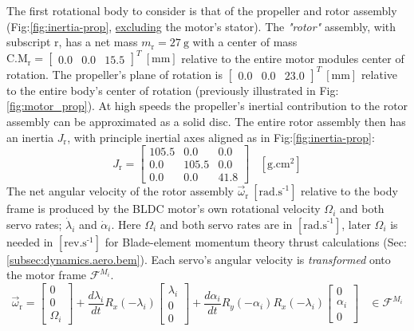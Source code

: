 \par
The first rotational body to consider is that of the propeller and rotor assembly (Fig:\ref{fig:inertia-prop}, \underline{excluding} the motor's stator). The \emph{"rotor"} assembly, with subscript r, has a net mass $m_{\text{r}}=27~\text{g}$ with a center of mass $\text{C.M}_{\text{r}}=\begin{bmatrix}0.0&0.0&15.5\end{bmatrix}^T~[\text{mm}]$ relative to the entire motor modules center of rotation. The propeller's plane of rotation is $\begin{bmatrix}0.0&0.0&23.0\end{bmatrix}^T~[\text{mm}]$ relative to the entire body's center of rotation (previously illustrated in Fig:\ref{fig:motor_prop}). At high speeds the propeller's inertial contribution to the rotor assembly can be approximated as a solid disc. The entire rotor assembly then has an inertia $J_\text{r}$, with principle inertial axes aligned as in Fig:\ref{fig:inertia-prop}:
\begin{equation}\label{eq:prop-inertia}
J_\text{r}=\begin{bmatrix}
105.5 & 0.0 & 0.0\\
0.0 & 105.5 & 0.0\\
0.0 & 0.0 & 41.8
\end{bmatrix}~~~~[\text{g.cm}^2]
\end{equation}
The net angular velocity of the rotor assembly $\vec{\omega}_\text{r}~[\text{rad.s}^{\text{-}1}]$ relative to the body frame is produced by the BLDC motor's own rotational velocity $\Omega_i$ and both servo rates; $\dot{\lambda}_i$ and $\dot{\alpha}_i$. Here $\Omega_i$ and both servo rates are in $[\text{rad.s}^{\text{-}1}]$, later $\Omega_i$ is needed in $[\text{rev.s}^{\text{-}1}]$ for Blade-element momentum theory thrust calculations (Sec:\ref{subsec:dynamics.aero.bem}). Each servo's angular velocity is \emph{transformed} onto the motor frame $\mathcal{F}^{M_i}$.
\begin{equation}\label{eq:net-angular-rot}
\vec{\omega}_\text{r}=\begin{bmatrix}
0\\
0\\
\Omega_i
\end{bmatrix}
+\frac{d\lambda_i}{dt}R_x(-\lambda_i)\begin{bmatrix}
\lambda_i\\
0\\
0
\end{bmatrix}+\frac{d\alpha_i}{dt}R_y(-\alpha_i)R_x(-\lambda_i)\begin{bmatrix}
0\\
\alpha_i\\
0
\end{bmatrix}~~~~\in\mathcal{F}^{M_i}
\end{equation}

